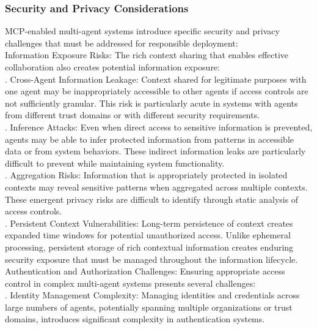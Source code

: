 \subsubsection{Security and Privacy Considerations}
MCP-enabled multi-agent systems introduce specific security and privacy challenges that must be addressed for responsible deployment:\\ \newline
Information Exposure Risks: The rich context sharing that enables effective collaboration also creates potential information exposure:\\ . Cross-Agent Information Leakage: Context shared for legitimate purposes with one agent may be inappropriately accessible to other agents if access controls are not sufficiently granular. This risk is particularly acute in systems with agents from different trust domains or with different security requirements.\\ . Inference Attacks: Even when direct access to sensitive information is prevented, agents may be able to infer protected information from patterns in accessible data or from system behaviors. These indirect information leaks are particularly difficult to prevent while maintaining system functionality.\\ . Aggregation Risks: Information that is appropriately protected in isolated contexts may reveal sensitive patterns when aggregated across multiple contexts. These emergent privacy risks are difficult to identify through static analysis of access controls.\\ . Persistent Context Vulnerabilities: Long-term persistence of context creates expanded time windows for potential unauthorized access. Unlike ephemeral processing, persistent storage of rich contextual information creates enduring security exposure that must be managed throughout the information lifecycle.\\ \newline
Authentication and Authorization Challenges: Ensuring appropriate access control in complex multi-agent systems presents several challenges:\\ . Identity Management Complexity: Managing identities and credentials across large numbers of agents, potentially spanning multiple organizations or trust domains, introduces significant complexity in authentication systems.\\ \newline
